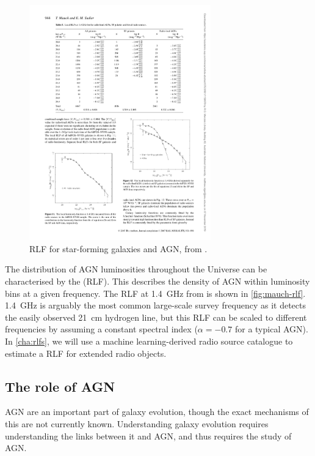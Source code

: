         \begin{figure}
            \centering
            \includegraphics[width=0.7\textwidth]{images/mauch07rlf.pdf}
            \caption{\label{fig:mauch-rlf} RLF for star-forming galaxies and AGN, from \citet{mauch07rlf}.}
        \end{figure}

        The distribution of AGN luminosities throughout the Universe can be characterised by the  (RLF). This describes the density of AGN within luminosity bins at a given frequency. The RLF at 1.4~GHz from \citet{mauch07rlf} is shown in \autoref{fig:mauch-rlf}. 1.4~GHz is arguably the most common large-scale survey frequency as it detects the easily observed 21~cm hydrogen line, but this RLF can be scaled to different frequencies by assuming a constant spectral index ($\alpha = -0.7$ for a typical AGN). In \autoref{cha:rlfs}, we will use a machine learning-derived radio source catalogue to estimate a RLF for extended radio objects.

    \subsection{The role of AGN}
    \label{sec:role-of-agn}

        AGN are an important part of galaxy evolution, though the exact mechanisms of this are not currently known. Understanding galaxy evolution requires understanding the links between it and AGN, and thus requires the study of AGN.

